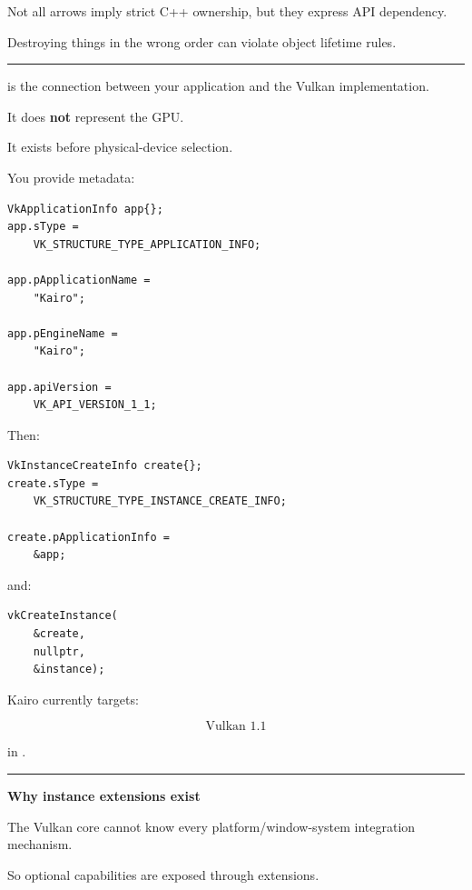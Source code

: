 Not all arrows imply strict C++ ownership, but they express API dependency.

Destroying things in the wrong order can violate object lifetime rules.

\begin{center}\rule{0.5\linewidth}{0.5pt}\end{center}

\textbf{}

 is the connection between your application and the Vulkan implementation.

It does \textbf{not} represent the GPU.

It exists before physical-device selection.

You provide metadata:

\begin{verbatim}
VkApplicationInfo app{};
app.sType =
    VK_STRUCTURE_TYPE_APPLICATION_INFO;

app.pApplicationName =
    "Kairo";

app.pEngineName =
    "Kairo";

app.apiVersion =
    VK_API_VERSION_1_1;
\end{verbatim}

Then:

\begin{verbatim}
VkInstanceCreateInfo create{};
create.sType =
    VK_STRUCTURE_TYPE_INSTANCE_CREATE_INFO;

create.pApplicationInfo =
    &app;
\end{verbatim}

and:

\begin{verbatim}
vkCreateInstance(
    &create,
    nullptr,
    &instance);
\end{verbatim}

Kairo currently targets:

\[
\boxed{\text{Vulkan 1.1}}
\]

in .

\begin{center}\rule{0.5\linewidth}{0.5pt}\end{center}

\textbf{Why instance extensions exist}

The Vulkan core cannot know every platform/window-system integration mechanism.

So optional capabilities are exposed through extensions.

